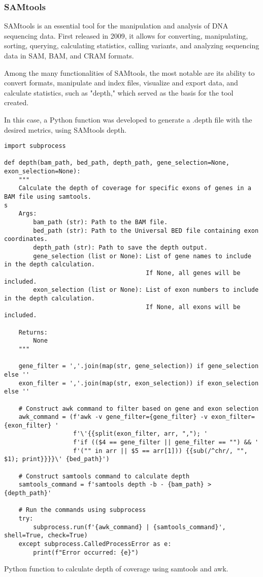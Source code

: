 \subsubsection{\textbf{SAMtools}}

SAMtools is an essential tool for the manipulation and analysis of DNA sequencing data. First released in 2009, it allows for converting, manipulating, sorting, querying, calculating statistics, calling variants, and analyzing sequencing data in SAM, BAM, and CRAM formats.

Among the many functionalities of SAMtools, the most notable are its ability to convert formats, manipulate and index files, visualize and export data, and calculate statistics, such as "depth," which served as the basis for the tool created. \cite{samtools}

In this case, a Python function was developed to generate a .depth file with the desired metrics, using SAMtools depth.

\begin{listing}[h]
\begin{verbatim}
import subprocess

def depth(bam_path, bed_path, depth_path, gene_selection=None, exon_selection=None): 
    """ 
    Calculate the depth of coverage for specific exons of genes in a BAM file using samtools.
s
    Args: 
        bam_path (str): Path to the BAM file.
        bed_path (str): Path to the Universal BED file containing exon coordinates.
        depth_path (str): Path to save the depth output.
        gene_selection (list or None): List of gene names to include in the depth calculation. 
                                       If None, all genes will be included.
        exon_selection (list or None): List of exon numbers to include in the depth calculation. 
                                       If None, all exons will be included.

    Returns: 
        None
    """ 
    
    gene_filter = ','.join(map(str, gene_selection)) if gene_selection else '' 
    exon_filter = ','.join(map(str, exon_selection)) if exon_selection else ''
    
    # Construct awk command to filter based on gene and exon selection
    awk_command = (f'awk -v gene_filter={gene_filter} -v exon_filter={exon_filter} '
                   f'\'{{split(exon_filter, arr, ","); '
                   f'if (($4 == gene_filter || gene_filter == "") && '
                   f'("" in arr || $5 == arr[1])) {{sub(/^chr/, "", $1); print}}}}\' {bed_path}')
    
    # Construct samtools command to calculate depth
    samtools_command = f'samtools depth -b - {bam_path} > {depth_path}'
    
    # Run the commands using subprocess
    try:
        subprocess.run(f'{awk_command} | {samtools_command}', shell=True, check=True)
    except subprocess.CalledProcessError as e:
        print(f"Error occurred: {e}")
\end{verbatim}
\caption{Python function to calculate depth of coverage using samtools and awk.}
\label{lbl:snippet-test}
\end{listing}


